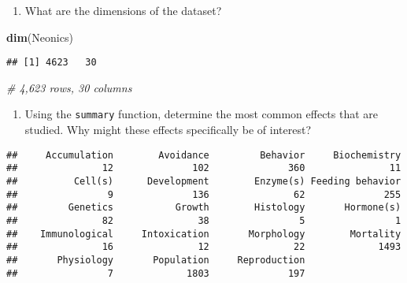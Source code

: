 \documentclass[]{article}
\newenvironment{Shaded}{\begin{snugshade}}{\end{snugshade}}
\newcommand{\CommentTok}[1]{\textcolor[rgb]{0.56,0.35,0.01}{\textit{#1}}}
\newcommand{\KeywordTok}[1]{\textcolor[rgb]{0.13,0.29,0.53}{\textbf{#1}}}
\newcommand{\NormalTok}[1]{#1}
\newcommand{\OperatorTok}[1]{\textcolor[rgb]{0.81,0.36,0.00}{\textbf{#1}}}
\providecommand{\tightlist}{%
  \setlength{\itemsep}{0pt}\setlength{\parskip}{0pt}}
\begin{document}
\begin{enumerate}
\def\labelenumi{\arabic{enumi}.}
\setcounter{enumi}{4}
\tightlist
\item
  What are the dimensions of the dataset?
\end{enumerate}

\begin{Shaded}
\begin{Highlighting}[]
\KeywordTok{dim}\NormalTok{(Neonics)}
\end{Highlighting}
\end{Shaded}

\begin{verbatim}
## [1] 4623   30
\end{verbatim}

\begin{Shaded}
\begin{Highlighting}[]
\CommentTok{# 4,623 rows, 30 columns}
\end{Highlighting}
\end{Shaded}

\begin{enumerate}
\def\labelenumi{\arabic{enumi}.}
\setcounter{enumi}{5}
\tightlist
\item
  Using the \texttt{summary} function, determine the most common effects
  that are studied. Why might these effects specifically be of interest?
\end{enumerate}

\begin{Shaded}
\end{Shaded}

\begin{verbatim}
##     Accumulation        Avoidance         Behavior     Biochemistry 
##               12              102              360               11 
##          Cell(s)      Development        Enzyme(s) Feeding behavior 
##                9              136               62              255 
##         Genetics           Growth        Histology       Hormone(s) 
##               82               38                5                1 
##    Immunological     Intoxication       Morphology        Mortality 
##               16               12               22             1493 
##       Physiology       Population     Reproduction 
##                7             1803              197
\end{verbatim}
\end{document}
